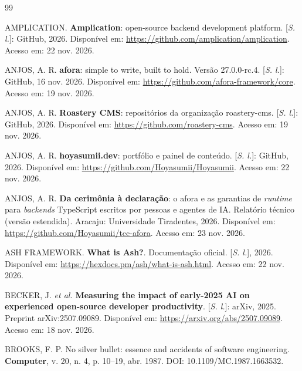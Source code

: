 \documentclass[a4paper,12pt]{article}
\providecommand{\NoCaseChange}[1]{#1} %
\DeclareRobustCommand{\etal}{\NoCaseChange{\textit{et al.}}}
\renewcommand{\refname}{Referências}\renewcommand{\contentsname}{Sumário}
\begin{document}
\renewcommand{\refname}{Referências}
\begin{thebibliography}{99}
\small
\setlength{\itemsep}{2pt}

AMPLICATION. \textbf{Amplication}: open-source backend development platform. [\textit{S. l.}]: GitHub, 2026. Disponível em: \url{https://github.com/amplication/amplication}. Acesso em: 22 nov. 2026.

ANJOS, A. R. \textbf{afora}: simple to write, built to hold. Versão 27.0.0-rc.4. [\textit{S. l.}]: GitHub, 16 nov. 2026. Disponível em: \url{https://github.com/afora-framework/core}. Acesso em: 19 nov. 2026.

ANJOS, A. R. \textbf{Roastery CMS}: repositórios da organização roastery-cms. [\textit{S. l.}]: GitHub, 2026. Disponível em: \url{https://github.com/roastery-cms}. Acesso em: 19 nov. 2026.

ANJOS, A. R. \textbf{hoyasumii.dev}: portfólio e painel de conteúdo. [\textit{S. l.}]: GitHub, 2026. Disponível em: \url{https://github.com/Hoyasumii/Hoyasumii}. Acesso em: 22 nov. 2026.

ANJOS, A. R. \textbf{Da cerimônia à declaração}: o afora e as garantias de \textit{runtime} para \textit{backends} TypeScript escritos por pessoas e agentes de IA. Relatório técnico (versão estendida). Aracaju: Universidade Tiradentes, 2026. Disponível em: \url{https://github.com/Hoyasumii/tcc-afora}. Acesso em: 23 nov. 2026.

ASH FRAMEWORK. \textbf{What is Ash?}. Documentação oficial. [\textit{S. l.}], 2026. Disponível em: \url{https://hexdocs.pm/ash/what-is-ash.html}. Acesso em: 22 nov. 2026.

\bibitem[{Becker \etal}(2025)]{becker2025}
BECKER, J. \textit{et al.} \textbf{Measuring the impact of early-2025 AI on experienced open-source developer productivity}. [\textit{S. l.}]: arXiv, 2025. Preprint arXiv:2507.09089. Disponível em: \url{https://arxiv.org/abs/2507.09089}. Acesso em: 18 nov. 2026.

BROOKS, F. P. No silver bullet: essence and accidents of software engineering. \textbf{Computer}, v. 20, n. 4, p. 10--19, abr. 1987. DOI: 10.1109/MC.1987.1663532.


\end{thebibliography}
\end{document}
